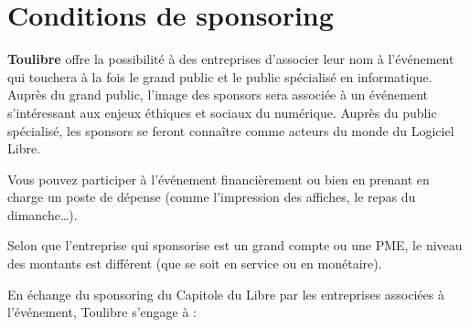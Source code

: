 \documentclass{cdl_sponsor}
\begin{document}
\section{Conditions de sponsoring}

\textbf{Toulibre} offre la possibilité à des entreprises d'associer leur nom à l'événement  qui touchera à la fois le grand public et le public spécialisé en informatique. Auprès du grand public, l'image des sponsors sera associée à un événement s'intéressant aux enjeux éthiques et sociaux du numérique. Auprès du public spécialisé, les sponsors se feront connaître comme acteurs du monde du Logiciel Libre.\par 
Vous pouvez participer à l'événement financièrement ou bien en prenant en charge un poste de dépense (comme l'impression des affiches, le repas du dimanche\dots).

\Separateur

Selon que l'entreprise qui sponsorise est un grand compte ou une PME, le niveau des montants est différent (que se soit en service ou en monétaire).

\Separateur

En échange du sponsoring du Capitole du Libre par les entreprises associées à l'événement, Toulibre s'engage à :
\end{document}
